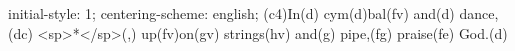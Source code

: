 initial-style: 1;
centering-scheme: english;
(c4)In(d) cym(d)bal(fv) and(d) dance,(dc) <sp>*</sp>(,) up(fv)on(gv) strings(hv) and(g) pipe,(fg) praise(fe) God.(d)
